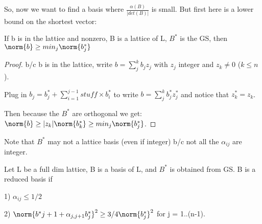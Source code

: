 So, now we want to find a basis where $\frac{\alpha(B)}{|det(B)|}$ is small. But first here is a lower bound on the shortest vector:

\begin{theorem}
If b is in the lattice and nonzero, B is a lattice of L, $B^*$ is the GS, then $\norm{b} \geq min_j \norm{b^*_j}$
\end{theorem}
\begin{proof}
b/c b is in the lattice, write $b = \sum_j^k b_jz_j$ with $z_j$ integer and $z_k \neq 0$ ($k \leq n$). 

Plug in $b_j = b^*_j + \sum_{i=1}^{j-1} stuff \times b^*_i$ to write $b = \sum_j^k b^*_jz^*_j$ and notice that $z^*_k = z_k$. 

Then because the $B^*$ are orthogonal we get: $\norm{b} \geq |z_k| \norm{b^*_k} \geq min_j \norm{b^*_j}$.
\end{proof}

Note that $B^*$ may not a lattice basis (even if integer) b/c not all the $\alpha_{ij}$ are integer.




\begin{definition}
Let L be a full dim lattice, B is a basis of L, and $B^*$ is obtained from GS. B is a reduced basis if

1) $\alpha_{ij} \leq 1/2$

2) $\norm{b^*{j+1} + \alpha_{j,j+1}b^*_j}^2 \geq 3/4 \norm{b^*_j}^2$ for j = 1..(n-1).
\end{definition}


